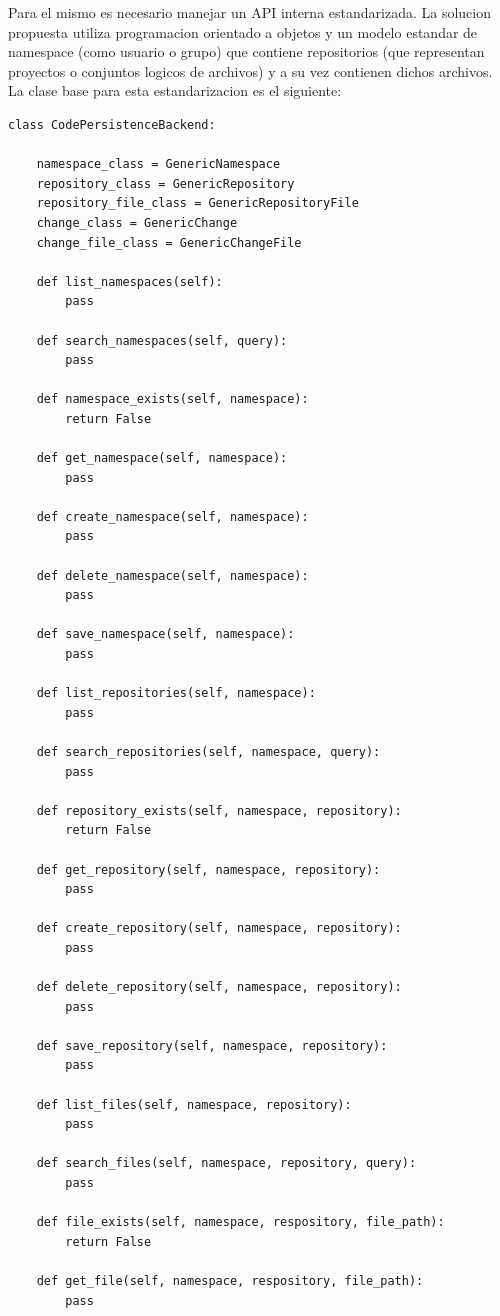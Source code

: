 Para el mismo es necesario manejar un API interna estandarizada. La solucion propuesta utiliza programacion orientado a objetos y un modelo estandar de namespace (como usuario o grupo) que contiene repositorios (que representan proyectos o conjuntos logicos de archivos) y a su vez contienen dichos archivos. La clase base para esta estandarizacion es el siguiente:
\lstset{language=Python}
\begin{lstlisting}
class CodePersistenceBackend:
    
    namespace_class = GenericNamespace
    repository_class = GenericRepository
    repository_file_class = GenericRepositoryFile
    change_class = GenericChange
    change_file_class = GenericChangeFile

    def list_namespaces(self):
        pass

    def search_namespaces(self, query):
        pass

    def namespace_exists(self, namespace):
        return False

    def get_namespace(self, namespace):
        pass

    def create_namespace(self, namespace):
        pass

    def delete_namespace(self, namespace):
        pass

    def save_namespace(self, namespace):
        pass

    def list_repositories(self, namespace):
        pass

    def search_repositories(self, namespace, query):
        pass

    def repository_exists(self, namespace, repository):
        return False

    def get_repository(self, namespace, repository):
        pass

    def create_repository(self, namespace, repository):
        pass

    def delete_repository(self, namespace, repository):
        pass

    def save_repository(self, namespace, repository):
        pass

    def list_files(self, namespace, repository):
        pass

    def search_files(self, namespace, repository, query):
        pass

    def file_exists(self, namespace, respository, file_path):
        return False

    def get_file(self, namespace, respository, file_path):
        pass


\end{lstlisting}
